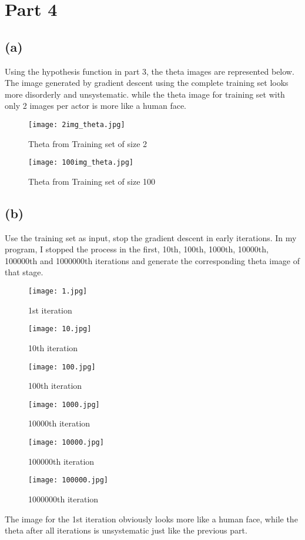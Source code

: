 \documentclass{article}
\begin{document}
\vspace*{6cm}
\section*{Part 4}
\subsection*{(a)}
Using the hypothesis function in part 3, the theta images are represented below. The image generated by gradient descent using the complete training set looks more disorderly and unsystematic. while the theta image for training set with only 2 images per actor is more like a human face.
\begin{figure}[!htb]
  \texttt{[image: 2img\_theta.jpg]}
  \caption*{Theta from Training set of size 2}\label{fig:2}
\endminipage\hfill
{}
  \texttt{[image: 100img\_theta.jpg]}
  \caption*{Theta from Training set of size 100}\label{fig:100}
\endminipage
\end{figure}
\subsection*{(b)}
Use the training set as input, stop the gradient descent in early iterations. In my program, I stopped the process in the first, 10th, 100th, 1000th, 10000th, 100000th and 1000000th iterations and generate the corresponding theta image of that stage.

\begin{figure}[!htb]
  \texttt{[image: 1.jpg]}
  \caption*{1st iteration}\label{fig:2}
\endminipage\hfill
{}
  \texttt{[image: 10.jpg]}
  \caption*{10th iteration}\label{fig:2}
\endminipage\hfill
{}
  \texttt{[image: 100.jpg]}
  \caption*{100th iteration}\label{fig:2}
\endminipage\hfill
{}
  \texttt{[image: 1000.jpg]}
  \caption*{10000th iteration}\label{fig:2}
\endminipage\hfill
{}
  \texttt{[image: 10000.jpg]}
  \caption*{100000th iteration}\label{fig:2}
\endminipage\hfill
{}
  \texttt{[image: 100000.jpg]}
  \caption*{1000000th iteration}\label{fig:100}
\endminipage
\end{figure}
The image for the 1st iteration obviously looks more like a human face, while the theta after all iterations is unsystematic just like the previous part.
\end{document}
